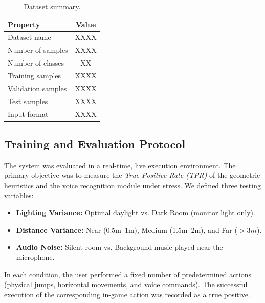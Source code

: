 \documentclass[10pt,twocolumn,a4paper]{article}
\begin{document}
	\begin{table}[h]
		\centering
		\caption{Dataset summary.}
		\label{tab:dataset}
		\begin{tabular}{|l|c|}
			\hline
			\textbf{Property} & \textbf{Value} \\
			\hline
			Dataset name & XXXX \\
			Number of samples & XXXX \\
			Number of classes & XX \\
			Training samples & XXXX \\
			Validation samples & XXXX \\
			Test samples & XXXX \\
			Input format & XXXX \\
			\hline
		\end{tabular}
	\end{table}
	
	\subsection{Training and Evaluation Protocol}
    The system was evaluated in a real-time, live execution environment. The primary objective was to measure the \textit{True Positive Rate (TPR)} of the geometric heuristics and the voice recognition module under stress. We defined three testing variables:
    \begin{itemize}
        \item \textbf{Lighting Variance:} Optimal daylight vs. Dark Room (monitor light only).
        \item \textbf{Distance Variance:} Near (0.5m--1m), Medium (1.5m--2m), and Far ($>3m$).
        \item \textbf{Audio Noise:} Silent room vs. Background music played near the microphone.
    \end{itemize}
    In each condition, the user performed a fixed number of predetermined actions (physical jumps, horizontal movements, and voice commands). The successful execution of the corresponding in-game action was recorded as a true positive.
\end{document}
